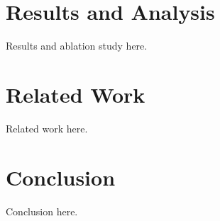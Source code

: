 \documentclass[acmsmall,manuscript,review,anonymous]{acmart}
\begin{document}
\section{Results and Analysis}
\label{sec:results}
Results and ablation study here.

\section{Related Work}
\label{sec:related}
Related work here.

\section{Conclusion}
\label{sec:conclusion}
Conclusion here.




\end{document}
